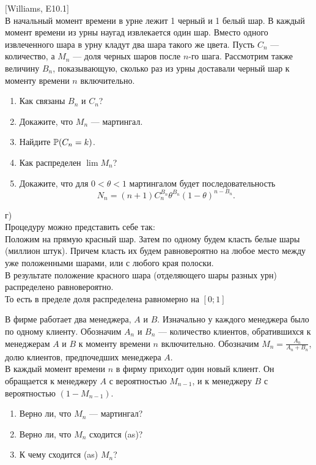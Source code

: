 \begin{problem}
$[$Williams, E10.1$]$ \\
В начальный момент времени в урне лежит 1 черный и 1 белый шар. В
каждый момент времени из урны наугад извлекается один шар. Вместо
одного извлеченного шара в урну кладут два шара такого же цвета.
Пусть $C_{n}$ — количество, а $M_{n}$ — доля черных шаров после
$n$-го шага. Рассмотрим также величину $B_{n}$, показывающую,
сколько раз из урны доставали черный шар к моменту времени $n$
включительно.
\begin{enumerate}
\item Как связаны $B_{n}$ и $C_{n}$?
\item Докажите, что $M_{n}$ — мартингал.
\item Найдите $\P(C_{n}=k)$.
\item Как распределен $\lim M_{n}$?
\item Докажите, что для $0<\theta<1$ мартингалом будет последовательность
\[
N_{n}=(n+1)C_{n}^{B_{n}}\theta^{B_{n}}(1-\theta)^{n-B_{n}}.
\]
\end{enumerate}

\begin{sol}
 г) \\
Процедуру можно представить себе так: \\
Положим на прямую красный шар. Затем по одному будем класть белые шары (миллион штук). Причем класть их будем равновероятно на любое место между уже положенными шарами, или с любого края полоски. \\
В результате положение красного шара (отделяющего шары разных урн) распределено равновероятно. \\
То есть в пределе доля распределена равномерно на $[0;1]$
\end{sol}
\end{problem}

\begin{problem}
В фирме работает два менеджера, $A$ и $B$. Изначально у каждого менеджера было по одному клиенту. Обозначим $A_{n}$ и $B_{n}$ — количество клиентов, обратившихся к менеджерам $A$ и $B$ к моменту времени $n$ включительно. Обозначим $M_{n}=\frac{A_{n}}{A_{n}+B_{n}}$, долю клиентов, предпочедших менеджера $A$. \\
В каждый момент времени $n$ в фирму приходит один новый клиент. Он обращается к менеджеру $A$ с вероятностью $M_{n-1}$, и к менеджеру $B$ с вероятностью $(1-M_{n-1})$.
\begin{enumerate}
\item Верно ли, что $M_{n}$ — мартингал?
\item Верно ли, что $M_{n}$ сходится (as)?
\item К чему сходится (as) $M_{n}$?
\end{enumerate}

\begin{sol}

\end{sol}
\end{problem}

